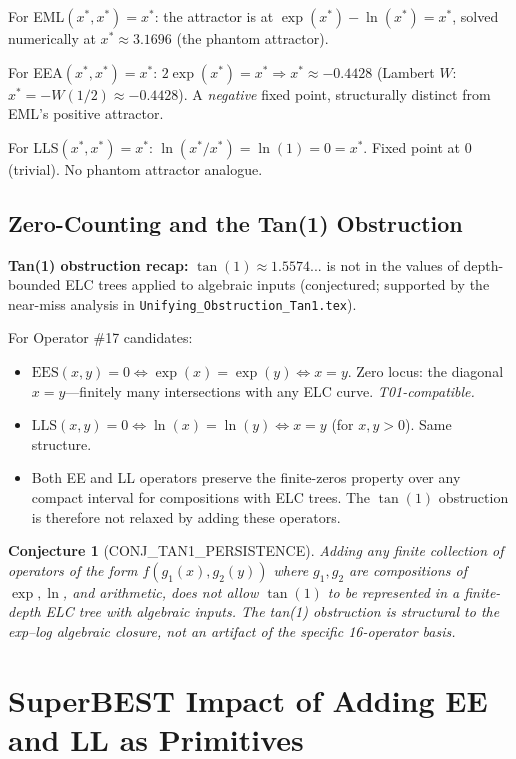 \documentclass[11pt]{article}
\newtheorem{conjecture}[theorem]{Conjecture}
\begin{document}
For EML$(x^*,x^*) = x^*$: the attractor is at $\exp(x^*) - \ln(x^*) = x^*$,
solved numerically at $x^* \approx 3.1696$ (the phantom attractor).

For EEA$(x^*,x^*) = x^*$: $2\exp(x^*) = x^* \Rightarrow x^* \approx -0.4428$
(Lambert $W$: $x^* = -W(1/2) \approx -0.4428$). A \emph{negative} fixed point,
structurally distinct from EML's positive attractor.

For LLS$(x^*,x^*) = x^*$: $\ln(x^*/x^*) = \ln(1) = 0 = x^*$.
Fixed point at 0 (trivial). No phantom attractor analogue.

\subsection{Zero-Counting and the Tan(1) Obstruction}

\noindent\textbf{Tan(1) obstruction recap:}
$\tan(1) \approx 1.5574...$ is not in the values of depth-bounded ELC trees
applied to algebraic inputs (conjectured; supported by the near-miss
analysis in \texttt{Unifying\_Obstruction\_Tan1.tex}).

For Operator \#17 candidates:
\begin{itemize}
  \item $\mathrm{EES}(x,y) = 0 \Leftrightarrow \exp(x) = \exp(y) \Leftrightarrow x = y$.
    Zero locus: the diagonal $x=y$---finitely many intersections with any ELC curve.
    \emph{T01-compatible.}
  \item $\mathrm{LLS}(x,y) = 0 \Leftrightarrow \ln(x) = \ln(y) \Leftrightarrow x = y$
    (for $x,y > 0$). Same structure.
  \item Both EE and LL operators preserve the finite-zeros property over any compact
    interval for compositions with ELC trees. The $\tan(1)$ obstruction is therefore
    not relaxed by adding these operators.
\end{itemize}

\begin{conjecture}[CONJ\_TAN1\_PERSISTENCE]
Adding any finite collection of operators of the form $f(g_1(x), g_2(y))$ where
$g_1, g_2$ are compositions of $\exp, \ln$, and arithmetic, does not allow
$\tan(1)$ to be represented in a finite-depth ELC tree with algebraic inputs.
The tan(1) obstruction is structural to the exp--log algebraic closure, not
an artifact of the specific 16-operator basis.
\end{conjecture}

\section{SuperBEST Impact of Adding EE and LL as Primitives}
\label{sec:superbest}
\end{document}
